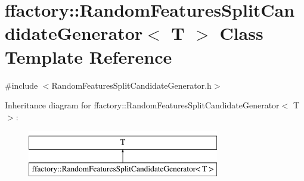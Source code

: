 \hypertarget{classffactory_1_1_random_features_split_candidate_generator}{\section{ffactory\-:\-:Random\-Features\-Split\-Candidate\-Generator$<$ T $>$ Class Template Reference}
\label{classffactory_1_1_random_features_split_candidate_generator}
}


{\ttfamily \#include $<$Random\-Features\-Split\-Candidate\-Generator.\-h$>$}

Inheritance diagram for ffactory\-:\-:Random\-Features\-Split\-Candidate\-Generator$<$ T $>$\-:\begin{figure}[H]
\begin{center}
\leavevmode
\includegraphics[height=2.000000cm]{classffactory_1_1_random_features_split_candidate_generator}
\end{center}
\end{figure}
